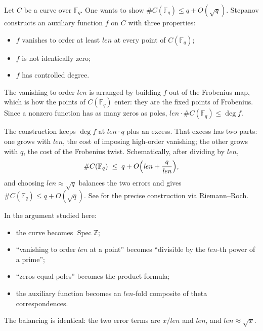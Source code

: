\documentclass[11pt]{amsart}
\theoremstyle{definition}
\theoremstyle{remark}
\newcommand{\len}{\mathit{len}}
\DeclareMathOperator{\Spec}{Spec}
\newcommand{\Z}{\mathbb{Z}}
\newcommand{\F}{\mathbb{F}}
\begin{document}
Let $C$ be a curve over $\F_q$. One wants to show $\#C(\F_q)\le q+O(\sqrt q)$. Stepanov constructs an auxiliary function $f$ on $C$ with three properties:
\begin{itemize}
\item $f$ vanishes to order at least $\len$ at every point of $C(\F_q)$;
\item $f$ is not identically zero;
\item $f$ has controlled degree.
\end{itemize}
The vanishing to order $\len$ is arranged by building $f$ out of the Frobenius map, which is how the points of $C(\F_q)$ enter: they are the fixed points of Frobenius. Since a nonzero function has as many zeros as poles, $\len\cdot\#C(\F_q)\le\deg f$.

The construction keeps $\deg f$ at $\len\cdot q$ plus an excess. That excess has two parts: one grows with $\len$, the cost of imposing high-order vanishing; the other grows with $q$, the cost of the Frobenius twist. Schematically, after dividing by $\len$,
\[
\#C(\F_q)\;\le\;q+O\Bigl(\len+\frac{q}{\len}\Bigr),
\]
and choosing $\len\approx\sqrt q$ balances the two errors and gives $\#C(\F_q)\le q+O(\sqrt q)$. See \cite{Bombieri-Stepanov} for the precise construction via Riemann--Roch.

In the argument studied here:
\begin{itemize}
\item the curve becomes $\Spec\Z$;
\item ``vanishing to order $\len$ at a point'' becomes ``divisible by the $\len$-th power of a prime'';
\item ``zeros equal poles'' becomes the product formula;
\item the auxiliary function becomes an $\len$-fold composite of theta correspondences.
\end{itemize}
The balancing is identical: the two error terms are $x/\len$ and $\len$, and $\len\approx\sqrt x$.
\end{document}
